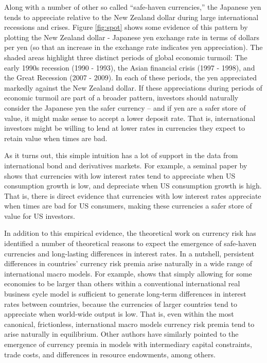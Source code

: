 \documentclass{ar-1col}
\begin{document}
Along with a number of other so called ``safe-haven currencies,'' the Japanese yen tends to appreciate relative to the New Zealand dollar during large international recessions and crises. Figure \ref{fig:spot} shows some evidence of this pattern by plotting the New Zealand dollar - Japanese yen exchange rate in terms of dollars per yen (so that an increase in the exchange rate indicates yen appreciation). The shaded areas highlight three distinct periods of global economic turmoil: The early 1990s recession (1990 - 1993), the Asian financial crisis (1997 - 1998), and the Great Recession (2007 - 2009). In each of these periods, the yen appreciated markedly against the New Zealand dollar. If these appreciations during periods of economic turmoil are part of a broader pattern, investors should naturally consider the Japanese yen the safer currency -- and if yen are a safer store of value, it might make sense to accept a lower deposit rate. That is, international investors might be willing to lend at lower rates in currencies they expect to retain value when times are bad.

As it turns out, this simple intuition has a lot of support in the data from international bond and derivatives markets. For example, a seminal paper by \citet{LustigVerdelhan2007} shows that currencies with low interest rates tend to appreciate when US consumption growth is low, and depreciate when US consumption growth is high. That is, there is direct evidence that currencies with low interest rates appreciate when times are bad for US consumers, making these currencies a safer store of value for US investors.

In addition to this empirical evidence, the theoretical work on currency risk has identified a number of theoretical reasons to expect the emergence of safe-haven currencies and long-lasting differences in interest rates. In a nutshell, persistent differences in countries' currency risk premia arise naturally in a wide range of international macro models. For example, \citet{Hassan2013} shows that simply allowing for some economies to be larger than others within a conventional international real business cycle model is sufficient to generate long-term differences in interest rates between countries, because the currencies of larger countries tend to appreciate when world-wide output is low. That is, even within the most canonical, frictionless, international macro models currency risk premia tend to arise naturally in equilibrium. Other authors have similarly pointed to the emergence of currency premia in models with intermediary capital constraints, trade costs, and differences in resource endowments, among others.
\end{document}
